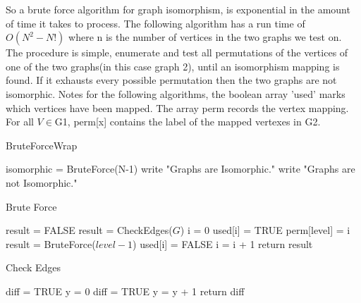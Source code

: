 \documentclass[notitlepage]{report}
\begin{document}
So a brute force algorithm for graph isomorphism, is exponential in the amount of time it takes to process. The following algorithm has a run time of $O(N^{2}-N!)$ where n is the number of vertices in the two graphs we test on. The procedure is simple, enumerate and test all permutations of the vertices of one of the two graphs(in this case graph 2), until an isomorphism mapping is found. If it exhausts every possible permutation then the two graphs are not isomorphic. Notes for the following algorithms, the boolean array 'used' marks which vertices have been mapped. The array perm records the vertex mapping. For all $V\in$G1, perm[x] contains the label of the mapped vertexes in G2.~\cite{tolley}

\begin{algorithm}
\caption{BruteForceWrap}
\begin{algorithmic}[1]

    \State isomorphic = BruteForce(N-1) 
        \State write "Graphs are Isomorphic."
    \Else
    	\State write "Graphs are not Isomorphic."
    \EndIf
    \label{A1}
\EndProcedure
\end{algorithmic}
\end{algorithm}

\begin{algorithm}
\caption{Brute Force}
\begin{algorithmic}[1]

    \State result = FALSE 								
    	\State result = CheckEdges($G$)
    \Else
    	\State i = 0
	    				
	        	\State used[i] = TRUE 					
	        	\State perm[level] = i
	        	\State result = BruteForce($level - 1$)
	        	\State used[i] = FALSE					
	        \EndIf
	        \State i = i + 1	
	    \EndWhile
	\EndIf
	\State return result
\label{BruteForce}
\EndProcedure

\end{algorithmic}
\end{algorithm}

\begin{algorithm}
\caption{Check Edges}
\begin{algorithmic}[1]

    \State diff = TRUE
        \State y = 0
        	\State diff = TRUE
        \EndIf
        \State y = y + 1
        \EndWhile
    \EndFor
    \State return diff
\label{CheckEdge}
\EndProcedure

\end{algorithmic}
\end{algorithm}
\newpage
\end{document}
